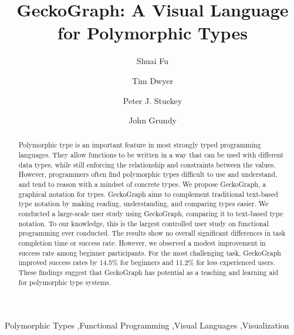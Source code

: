 \documentclass[preprint,12pt]{elsarticle}
\begin{document}
\begin{frontmatter}

 \author{Shuai Fu}

 \author{Tim Dwyer}

 \author{Peter J. Stuckey}

 \author{John Grundy}




\title{GeckoGraph: A Visual Language for Polymorphic Types}

\begin{abstract}
Polymorphic type is an important feature in most strongly typed programming languages. They allow functions to be written in a way that can be used with different data types, while still enforcing the relationship and constraints between the values. However, programmers often find polymorphic types difficult to use and understand, and tend to reason with a mindset of concrete types. We propose GeckoGraph, a graphical notation for types. GeckoGraph aims to complement traditional text-based type notation by making reading, understanding, and comparing types easier. We conducted a large-scale user study using GeckoGraph, comparing it to text-based type notation. To our knowledge, this is the largest controlled user study on functional programming ever conducted. 
The results show no overall significant differences in task completion time or success rate. However, we observed a modest improvement in success rate among beginner participants. For the most challenging task, GeckoGraph improved success rates by 14.5\% for beginners and 11.2\% for less experienced users. These findings suggest that GeckoGraph has potential as a teaching and learning aid for polymorphic type systems.
\end{abstract}

\begin{keyword}


Polymorphic Types \sep Functional Programming \sep Visual Languages \sep Visualization
\end{keyword}

\end{frontmatter}

\linenumbers
\end{document}
